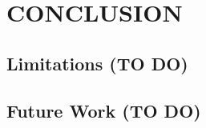 \chapter{CONCLUSION}
\label{ch:conclusion}

\section{Limitations (TO DO)}

\section{Future Work (TO DO)}